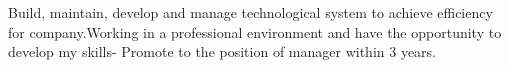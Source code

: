 \documentclass[a4paper,12pt]{memoir} %
\begin{document}
\userinformation %

\framebreak %





{Build, maintain, develop and manage technological system to achieve efficiency for company.Working in a professional environment and have the opportunity to develop my skills- Promote to the position of manager within 3 years.}








\Sep %



\end{document}
